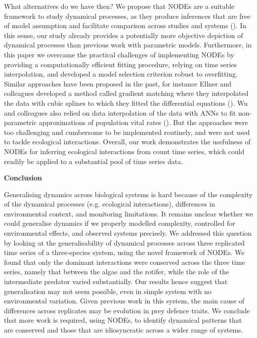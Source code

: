 \documentclass[11pt, oneside]{article}
\begin{document}
What alternatives do we have then?
We propose that NODEs are a suitable framework to study dynamical processes, as they produce inferences that are free of model assumption and facilitate comparison across studies and systems (\cite{Bonnaffe2021a}).
In this sense, our study already provides a potentially more objective depiction of dynamical processes than previous work with parametric models. 
Furthermore, in this paper we overcame the practical challenges of implementing NODEs by providing a computationally efficient fitting procedure, relying on time series interpolation, and developed a model selection criterion robust to overfitting.
Similar approaches have been proposed in the past, for instance Ellner and colleagues developed a method called gradient matching where they interpolated the data with cubic splines to which they fitted the differential equations (\cite{Jost2000,Ellner2002}).
Wu and colleagues also relied on data interpolation of the data with ANNs to fit non-parametric approximations of population vital rates (\cite{Wu2005}).
But the approaches were too challenging and cumbersome to be implemented routinely, and were not used to tackle ecological interactions. %
Overall, our work demonstrates the usefulness of NODEs for inferring ecological interactions from count time series, which could readily be applied to a substantial pool of time series data.

\textbf{Conclusion}

Generalising dynamics across biological systems is hard because of the complexity of the dynamical processes (e.g. ecological interactions), differences in environmental context, and monitoring limitations. 
It remains unclear whether we could generalise dynamics if we properly modelled complexity, controlled for environmental effects, and observed systems precisely.
We addressed this question by looking at the generalisability of dynamical processes across three replicated time series of a three-species system, using the novel framework of NODEs.
We found that only the dominant interactions were conserved across the three time series, namely that between the algae and the rotifer, while the role of the intermediate predator varied substantially.
Our results hence suggest that generalisation may not seem possible, even in simple system with no environmental variation. 
Given previous work in this system, the main cause of differences across replicates may be evolution in prey defence traits.
We conclude that more work is required, using NODEs, to identify dynamical patterns that are conserved and those that are idiosyncratic across a wider range of systems.
\end{document}

